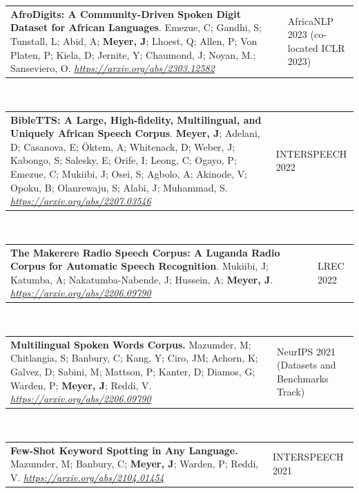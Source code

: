 \documentclass{resume} %
\begin{document}
\vspace{.25cm}

\begin{tabular}{@{}p{}p{}@{}}
  {\bf AfroDigits: A Community-Driven Spoken Digit Dataset for African Languages}.
  {Emezue, C; Gandhi, S; Tunstall, L; Abid, A; \textbf{Meyer, J}; Lhoest, Q; Allen, P; Von Platen, P; Kiela, D; Jernite, Y; Chaumond, J; Noyan, M.; Sanseviero, O}.
  \emph{\url{https://arxiv.org/abs/2303.12582}}
  & {AfricaNLP 2023 (co-located ICLR 2023)}
\end{tabular}
       \\

\begin{tabular}{@{}p{}p{}@{}}
  {\bf BibleTTS: A Large, High-fidelity, Multilingual, and Uniquely African Speech Corpus}.
  {\textbf{Meyer, J}; Adelani, D; Casanova, E; Öktem, A; Whitenack, D; Weber, J; Kabongo, S; Salesky, E; Orife, I; Leong, C; Ogayo, P; Emezue, C; Mukiibi, J; Osei, S; Agbolo, A; Akinode, V; Opoku, B; Olanrewaju, S; Alabi, J; Muhammad, S}.
  \emph{\url{https://arxiv.org/abs/2207.03546}}
  & {INTERSPEECH 2022}
\end{tabular}
\\
       
       \begin{tabular}{@{}p{}p{}@{}}
  {\bf The Makerere Radio Speech Corpus: A Luganda Radio Corpus for Automatic Speech Recognition}.
  {Mukiibi, J; Katumba, A; Nakatumba-Nabende, J; Hussein, A; \textbf{Meyer, J}}.
  \emph{\url{https://arxiv.org/abs/2206.09790}}
  &
       {LREC 2022}
\end{tabular}
\\

\begin{tabular}{@{}p{}p{}@{}}
{\bf Multilingual Spoken Words Corpus.}
{Mazumder, M; Chitlangia, S; Banbury, C; Kang, Y; Ciro, JM; Achorn, K; Galvez, D; Sabini, M; Mattson, P; Kanter, D; Diamos, G; Warden, P; \textbf{Meyer, J}; Reddi, V.}
\emph{\url{https://arxiv.org/abs/2206.09790}}
&
     {NeurIPS 2021 (Datasets and Benchmarks Track)}
\end{tabular}
\\

\begin{tabular}{@{}p{}p{}@{}}
  {\bf Few-Shot Keyword Spotting in Any Language.}
  {Mazumder, M; Banbury, C; \textbf{Meyer, J}; Warden, P; Reddi, V.}
  \emph{\url{https://arxiv.org/abs/2104.01454}}
  &
  {INTERSPEECH 2021}
\end{tabular}
\\
\end{document}
